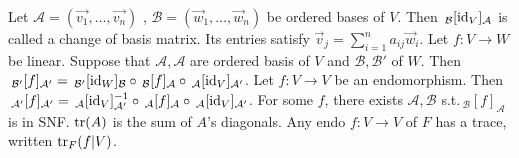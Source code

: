  Let $\mathcal{A} = (\vec{v_1}, \dots, \vec{v_n})$ , $\mathcal{B} = (\vec{w}_1, \dots, \vec{w}_n)$ be ordered bases of $V$. Then $\,_\mathcal{B}[\text{id}_V]_\mathcal{A}$ is called a change of basis matrix. Its entries satisfy $\vec{v}_j = \sum_{i=1}^n a_{ij}\vec{w}_i$.
 Let $f : V \to W$ be linear. Suppose that $\mathcal{A}, \mathcal{A}$ are ordered basis of $V$ and $\mathcal{B}, \mathcal{B}'$ of $W$. Then $\,_{\mathcal{B}'}[f]_{\mathcal{A}'} = \,_{\mathcal{B}'}[\text{id}_W]_{\mathcal{B}} \circ \,_{\mathcal{B}}[f]_{\mathcal{A}} \circ \,_{\mathcal{A}}[\text{id}_V]_{\mathcal{A}'}$.
 Let $f : V \to V$ be an endomorphism. Then $\,_{\mathcal{A}'}[f]_{\mathcal{A}'} = \,_{\mathcal{A}}[\text{id}_V]_{\mathcal{A}'}^{-1} \circ \,_{\mathcal{A}}[f]_{\mathcal{A}} \circ \,_{\mathcal{A}}[\text{id}_V]_{\mathcal{A}'}$.
 For some $f$, there exists $\mathcal{A}, \mathcal{B}$ s.t.\@ $\,_{\mathcal{B}}[f]_{\mathcal{A}}$ is in SNF.
 $\text{tr}(A)$ is the sum of $A$'s diagonals. Any endo $f : V \to V$ of $F$ has a trace, written $\text{tr}_F(f|V)$.